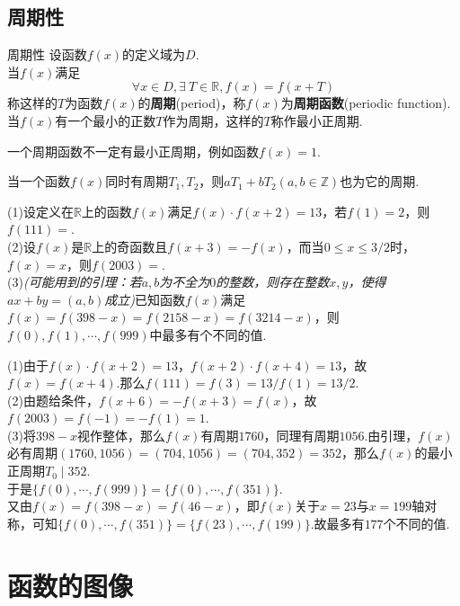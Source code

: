\documentclass[lang=cn, zihao=5]{elegantbook}
\newcommand{\R}{\mathbb{R}}
\newcommand{\tk}{\uline{\hspace{4em}}}
\begin{document}
\newpage
\subsection{周期性}

\begin{definition}{周期性} %
    设函数$f(x)$的定义域为$D$.\\
    当$f(x)$满足$$\forall x \in D, \exists \ T \in \mathbb{R}, f(x)=f(x+T)$$
    称这样的$T$为函数$f(x)$的\textbf{周期}(period)，称$f(x)$为\textbf{周期函数}(periodic function).当$f(x)$有一个最小的正数$T$作为周期，这样的$T$称作最小正周期.
\end{definition}
\begin{remark}
    一个周期函数不一定有最小正周期，例如函数$f(x)=1$.
\end{remark}
\begin{remark}
    当一个函数$f(x)$同时有周期$T_1,T_2$，则$aT_1+bT_2(a,b \in \mathbb{Z})$也为它的周期.
\end{remark}

\begin{example}
	(1)设定义在$\R$上的函数$f(x)$满足$f(x) \cdot f(x+2)=13$，若$f(1)=2$，则$f(111)=$\tk . \\
	(2)设$f(x)$是$\R$上的奇函数且$f(x+3)=-f(x)$，而当$0 \leq x \leq 3/2$时，$f(x)=x$，则$f(2003)=$\tk . \\
	(3)\textit{(可能用到的引理：若$a,b$为不全为$0$的整数，则存在整数$x,y$，使得$ax+by=(a,b)$成立)}已知函数$f(x)$满足$f(x)=f(398-x)=f(2158-x)=f(3214-x)$，则$f(0),f(1),\cdots ,f(999)$中最多有\tk 个不同的值.
\end{example}
\begin{solution}
	(1)由于$f(x) \cdot f(x+2)=13$，$f(x+2) \cdot f(x+4)=13$，故$f(x)=f(x+4)$.那么$f(111)=f(3)=13/f(1)=13/2$. \\
	(2)由题给条件，$f(x+6)=-f(x+3)=f(x)$，故$f(2003)=f(-1)=-f(1)=1$. \\
	(3)将$398-x$视作整体，那么$f(x)$有周期$1760$，同理有周期$1056$.由引理，$f(x)$必有周期$(1760,1056)=(704,1056)=(704,352)=352$，那么$f(x)$的最小正周期$T_0 \mid 352$. \\
	于是$\{ f(0),\cdots ,f(999) \} = \{ f(0),\cdots ,f(351) \}$. \\
	又由$f(x)=f(398-x)=f(46-x)$，即$f(x)$关于$x=23$与$x=199$轴对称，可知$\{ f(0),\cdots ,f(351) \} = \{ f(23),\cdots ,f(199) \}$.故最多有$177$个不同的值.
\end{solution}

\newpage
\section{函数的图像}
\end{document}
